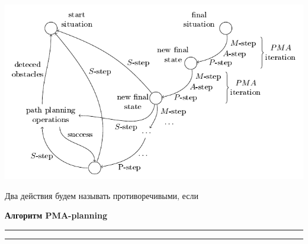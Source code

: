 \documentclass[preview,border=10pt]{standalone}
\begin{document}
	\begin{center}
		\includegraphics[width=\textwidth]{../images/strl/beh_plan}
	\end{center}
	
	Два действия будем называть противоречивыми, если 
	
	\textbf{Алгоритм PMA-planning}
	\vspace*{2pt}
	\hrule
	\vspace*{1pt}
	\hrule
		
	\begin{algorithmic}[1]
		
		
	\end{algorithmic}
\end{document}
